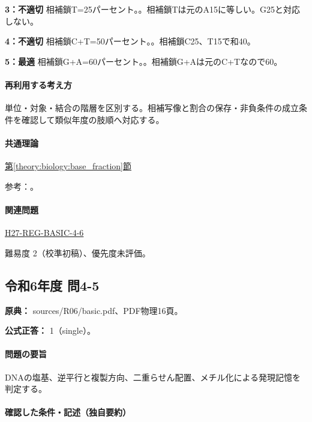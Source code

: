 \noindent\textbf{3：不適切} 相補鎖T=\allowbreak{}25パーセント。。相補鎖Tは元のA15に等しい。G25と対応しない。\par

\noindent\textbf{4：不適切} 相補鎖C+T=\allowbreak{}50パーセント。。相補鎖C25、T15で和40。\par

\noindent\textbf{5：最適} 相補鎖G+A=\allowbreak{}60パーセント。。相補鎖G+Aは元のC+Tなので60。\par

\paragraph{再利用する考え方} 単位・対象・結合の階層を区別する。相補写像と割合の保存・非負条件の成立条件を確認して類似年度の肢順へ対応する。

\paragraph{共通理論} \hyperref[theory:biology:base_fraction]{第\ref*{theory:biology:base_fraction}節}

\par 参考：\cite{nhgri_dna}。

\paragraph{関連問題} \hyperref[q:h27-reg-basic-4-6]{H27-REG-BASIC-4-6}

\par 難易度 2（校準初稿）、優先度未評価。

\subsection{令和6年度 問4-5}
\label{q:r06-reg-basic-4-5}

\noindent\textbf{原典：} sources/R06/basic.pdf、PDF物理16頁。

\textbf{公式正答：} 1（single）。

\paragraph{問題の要旨} DNAの塩基、逆平行と複製方向、二重らせん配置、メチル化による発現記憶を判定する。

\paragraph{確認した条件・記述（独自要約）}\mbox{}\par

